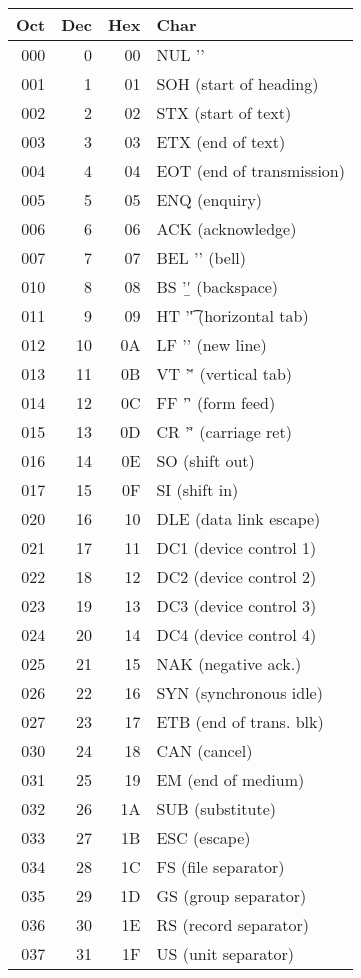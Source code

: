 \begin{tabular}{rrrl}
Oct & Dec & Hex & Char \\
\hline
000 & 0 & 00 & NUL '\0' \\
001 & 1 & 01 & SOH (start of heading) \\
002 & 2 & 02 & STX (start of text) \\
003 & 3 & 03 & ETX (end of text) \\
004 & 4 & 04 & EOT (end of transmission) \\
005 & 5 & 05 & ENQ (enquiry) \\
006 & 6 & 06 & ACK (acknowledge) \\
007 & 7 & 07 & BEL '\a' (bell) \\
010 & 8 & 08 & BS '\b' (backspace) \\
011 & 9 & 09 & HT '\t' (horizontal tab) \\
012 & 10 & 0A & LF '\n' (new line) \\
013 & 11 & 0B & VT '\v' (vertical tab) \\
014 & 12 & 0C & FF '\f' (form feed) \\
015 & 13 & 0D & CR '\r' (carriage ret) \\
016 & 14 & 0E & SO (shift out) \\
017 & 15 & 0F & SI (shift in) \\
020 & 16 & 10 & DLE (data link escape) \\
021 & 17 & 11 & DC1 (device control 1) \\
022 & 18 & 12 & DC2 (device control 2) \\
023 & 19 & 13 & DC3 (device control 3) \\
024 & 20 & 14 & DC4 (device control 4) \\
025 & 21 & 15 & NAK (negative ack.) \\
026 & 22 & 16 & SYN (synchronous idle) \\
027 & 23 & 17 & ETB (end of trans. blk) \\
030 & 24 & 18 & CAN (cancel) \\
031 & 25 & 19 & EM (end of medium) \\
032 & 26 & 1A & SUB (substitute) \\
033 & 27 & 1B & ESC (escape) \\
034 & 28 & 1C & FS (file separator) \\
035 & 29 & 1D & GS (group separator) \\
036 & 30 & 1E & RS (record separator) \\
037 & 31 & 1F & US (unit separator) \\

\end{tabular}
